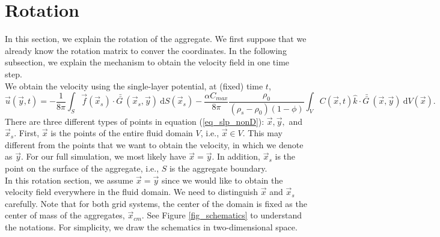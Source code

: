 \section{Rotation}
In this section, we explain the rotation of the aggregate. 
We first suppose that we already know the rotation matrix to conver the coordinates. In the following subsection, we explain the mechanism to obtain the velocity field in one time step.
\\
We obtain the velocity using the single-layer potential, at (fixed) time $t$,
\begin{equation}
	\vec{u} \left(\vec{y},t\right) 
		  =- \frac{1}{8 \pi} \int_{S}  
		 \vec{f}(\vec{x}_s) 
		 \cdot \bar{\bar{G \ }} (\vec{x}_s,\vec{y}) 
		 \ \textrm{d}S(\vec{x}_s) 
		 - \frac{ \alpha C_{max}}{8\pi } \frac{\rho_0}{(\rho_s - \rho_0)(1-\phi)}
		 \int_V  C \left(\vec{x} ,t \right) \hat{k} \cdot
		 \bar{\bar{G \ }}(\vec{x}, \vec{y} )
		 \ \text{d}V(\vec{x}).
	\label{eq_slp_nonD}
\end{equation}
There are three different types of points in equation (\ref{eq_slp_nonD}): $\vec{x}, \vec{y}, $ and $\vec{x}_s$. 
First, $\vec{x}$ is the points of the entire fluid domain  $V$, i.e., $\vec{x} \in V$. This may different from the points that we want to obtain the velocity, in which we denote as $\vec{y}$. For our full simulation, we most likely have $\vec{x} = \vec{y}$.
In addition, $\vec{x}_s$ is the point on the surface of the aggregate, i.e., $S$ is the aggregate boundary. 
\\
In this rotation section, we assume $\vec{x}=\vec{y}$ since we would like to obtain the velocity field everywhere in the fluid domain. We need to distinguish $\vec{x}$ and $\vec{x}_s$ carefully. 
Note that for both grid systems, the center of the domain is fixed as the center of mass of the aggregates, $\vec{x}_{cm}.$
See Figure \ref{fig_schematics} to understand the notations. For simplicity, we draw the schematics in two-dimensional space.
